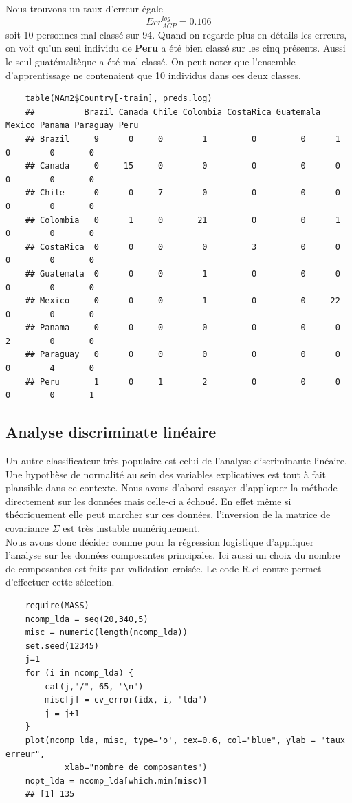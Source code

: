 \documentclass[12pt,a4paper]{article}
\begin{document}
Nous trouvons un taux d'erreur égale \[Err_{ACP}^{log} = 0.106\] soit 10 personnes mal classé sur 94. Quand on regarde plus en détails les erreurs, on voit qu'un seul individu de \textbf{Peru} a été bien classé sur les cinq présents. Aussi le seul guatémaltèque a été mal classé. On peut noter que l'ensemble d'apprentissage ne contenaient que 10 individus dans ces deux classes.
\begin{lstlisting}
	table(NAm2$Country[-train], preds.log)
	## 			Brazil Canada Chile Colombia CostaRica Guatemala Mexico Panama Paraguay Peru
	## Brazil     9      0     0        1         0         0      1      0        0       0
	## Canada     0     15     0        0         0         0      0      0        0       0
	## Chile      0      0     7        0         0         0      0      0        0       0
	## Colombia   0      1     0       21         0         0      1      0        0       0
	## CostaRica  0      0     0        0         3         0      0      0        0       0
	## Guatemala  0      0     0        1         0         0      0      0        0       0
	## Mexico     0      0     0        1         0         0     22      0        0       0
	## Panama     0      0     0        0         0         0      0      2        0       0
	## Paraguay   0      0     0        0         0         0      0      0        4       0
	## Peru       1      0     1        2         0         0      0      0        0       1
\end{lstlisting}
\subsection{Analyse discriminate linéaire}
Un autre classificateur très populaire est celui de l'analyse discriminante linéaire. Une hypothèse de normalité au sein des variables explicatives est tout à fait plausible dans ce contexte. Nous avons d'abord essayer d'appliquer la méthode directement sur les données mais celle-ci a échoué. En effet même si théoriquement elle peut marcher sur ces données, l'inversion de la matrice de covariance $\Sigma$ est très instable numériquement.\\
Nous avons donc décider comme pour la régression logistique d'appliquer l'analyse sur les données composantes principales. Ici aussi un choix du nombre de composantes est faits par validation croisée. Le code R ci-contre permet d'effectuer cette sélection.\vspace{2mm}
\begin{lstlisting}
	require(MASS)
	ncomp_lda = seq(20,340,5)
	misc = numeric(length(ncomp_lda))
	set.seed(12345)
	j=1
	for (i in ncomp_lda) {
		cat(j,"/", 65, "\n")
		misc[j] = cv_error(idx, i, "lda")
		j = j+1
	}
	plot(ncomp_lda, misc, type='o', cex=0.6, col="blue", ylab = "taux erreur",
			xlab="nombre de composantes")
	nopt_lda = ncomp_lda[which.min(misc)]
	## [1] 135
\end{lstlisting}
\end{document}
